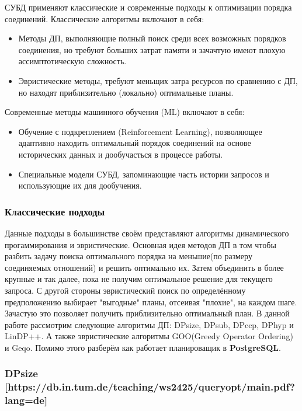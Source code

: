 \documentclass[12pt]{article}
\begin{document}
\begin{flushleft}
СУБД применяют классические и современные подходы к оптимизации 
порядка соединений.
\newline
Классические алгоритмы включают в себя:
\begin{itemize}
\item Методы ДП, выполняющие полный поиск среди всех возможных порядков
соединения, но требуют больших затрат памяти и зачачтую имеют плохую
ассимптотическую сложность.
\item Эвристические методы, требуют меньщих затра ресурсов по сравнению
с ДП, но находят приблизительно (локально) оптимальные планы.
\end{itemize}
Современные методы машинного обучения (ML) включают в себя:
\begin{itemize}
\item Обучение с подкреплением (Reinforcement Learning), позволяющее 
адаптивно находить оптимальный порядок соединений на основе исторических 
данных и дообучасться в процессе работы.
\item Специальные модели СУБД, запоминающие часть истории запросов и использующие их
для дообучения.
\end{itemize}

\centering \subsubsection*{Классические подходы}
\raggedright
Данные подходы в большинстве своём представляют алгоритмы динамического
прогаммирования и эвристические.
\newline
Основная идея методов ДП в том чтобы разбить задачу поиска оптимального
порядка на меньшие(по размеру соединяемых отношений) и решить оптимально их. Затем 
объединить в более крупные и так далее, пока не получим оптимальное решение 
для текущего запроса.
\newline
С другой стороны эвристический поиск по определённому предположению выбирает
"выгодные" планы, отсеивая "плохие", на каждом шаге. Зачастую это позволяет
получить приблизительно оптимальный план.
\newline
В данной работе рассмотрим следующие алгоритмы ДП: DPsize, DPsub, DPccp, 
DPhyp и LinDP++. А также эвристические алгоритмы GOO(Greedy Operator Ordering) и 
Geqo. Помимо этого разберём как работает планироващик в \textbf{PostgreSQL}.

\centering \subsubsection*{DPsize [https://db.in.tum.de/teaching/ws2425/queryopt/main.pdf?lang=de]} 
\raggedright


\end{flushleft}
\end{document}
